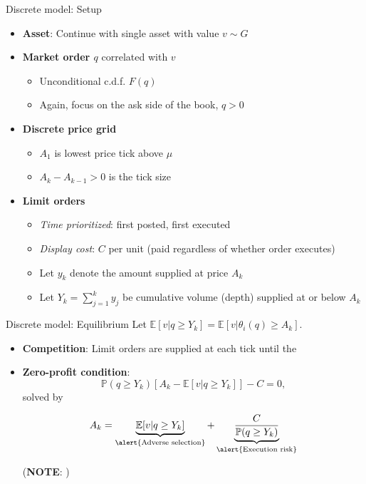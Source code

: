\documentclass[english,10pt
,aspectratio=169
]{beamer}
\begin{document}
\begin{frame}{Discrete model: Setup}
	\begin{itemize}
		\item \textbf{Asset}: Continue with single asset with value $v \sim G$
		\item \textbf{Market order $q$} correlated with $v$
		\begin{itemize}
			\item Unconditional c.d.f. $F(q)$
			\item Again, focus on the ask side of the book, $q>0$
		\end{itemize}
		\item \textbf{Discrete price grid}
		\begin{itemize}
			\item $A_1$ is lowest price tick above $\mu$
			\item $A_k-A_{k-1}>0$ is the tick size
		\end{itemize}
		\item \textbf{Limit orders}
		\begin{itemize}
			\item \textit{Time prioritized}: first posted, first executed
			\item \textit{Display cost}: $C$ per unit (paid regardless of whether order executes)
			\item Let $y_k$ denote the amount supplied at price $A_k$
			\item Let $Y_k=\sum_{j=1}^k y_j$ be cumulative volume (depth) supplied at or below $A_k$
		\end{itemize}
	\end{itemize}
\end{frame}


\begin{frame}{Discrete model: Equilibrium}
	Let $\mathbb{E}[v|q \geq Y_k]=\mathbb{E}[v|\theta_i(q) \geq A_k]$.
	\begin{itemize}
		\item \textbf{Competition}: Limit orders are supplied at each tick until the 
		\item \textbf{Zero-profit condition}:
		\[
		\mathbb{P}(q \geq Y_k)[A_k-\mathbb{E}[v|q \geq Y_k]] - C = 0,
		\]
		solved by
		\begin{block}{}
			\[
			A_k = \underbrace{\mathbb{E}[v| q \geq Y_k]}_{\text{\alert{Adverse selection}}} + \underbrace{\frac{C}{\mathbb{P}(q\geq Y_k)}}_{\text{\alert{Execution risk}}}
			\]
		\end{block}
		(\textbf{NOTE}: )
	\end{itemize}
\end{frame}
\end{document}
